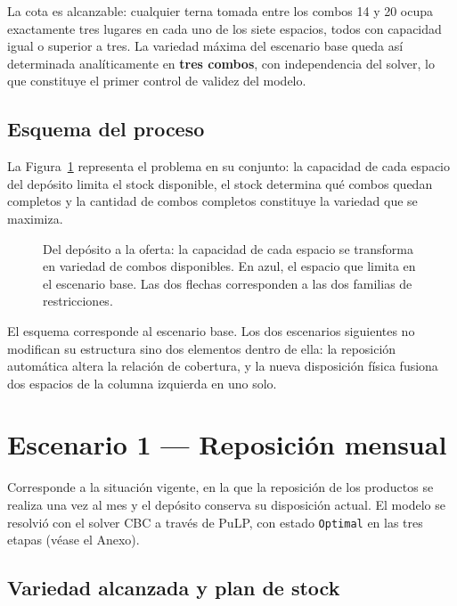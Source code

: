 \documentclass[10pt,a4paper]{article}
\begin{document}
La cota es alcanzable: cualquier terna tomada entre los combos 14 y 20 ocupa
exactamente tres lugares en cada uno de los siete espacios, todos con capacidad
igual o superior a tres. La variedad máxima del escenario base queda así
determinada analíticamente en \textbf{tres combos}, con independencia del
solver, lo que constituye el primer control de validez del modelo.

\subsection{Esquema del proceso}
\label{sec:esquema}

La Figura~\ref{fig:proceso} representa el problema en su conjunto: la capacidad
de cada espacio del depósito limita el stock disponible, el stock determina qué
combos quedan completos y la cantidad de combos completos constituye la variedad
que se maximiza.

\begin{figure}[H]
\centering
\resizebox{\linewidth}{!}{}
\caption{Del depósito a la oferta: la capacidad de cada espacio se transforma en
variedad de combos disponibles. En azul, el espacio que limita en el escenario
base. Las dos flechas corresponden a las dos familias de restricciones.}
\label{fig:proceso}
\end{figure}

El esquema corresponde al escenario base. Los dos escenarios siguientes no
modifican su estructura sino dos elementos dentro de ella: la reposición
automática altera la relación de cobertura, y la nueva disposición física
fusiona dos espacios de la columna izquierda en uno solo.

\section{Escenario 1 — Reposición mensual}
\label{sec:esc1}

Corresponde a la situación vigente, en la que la reposición de los productos se
realiza una vez al mes y el depósito conserva su disposición actual. El modelo
se resolvió con el solver CBC a través de PuLP, con estado \texttt{Optimal} en
las tres etapas (véase el Anexo).

\subsection{Variedad alcanzada y plan de stock}
\end{document}
